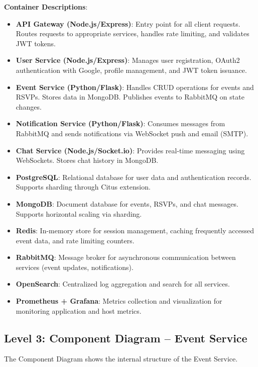 \documentclass[12pt,a4paper]{article}
\begin{document}
\textbf{Container Descriptions}:
\begin{itemize}
    \item \textbf{API Gateway (Node.js/Express)}: Entry point for all client requests. Routes requests to appropriate services, handles rate limiting, and validates JWT tokens.
    \item \textbf{User Service (Node.js/Express)}: Manages user registration, OAuth2 authentication with Google, profile management, and JWT token issuance.
    \item \textbf{Event Service (Python/Flask)}: Handles CRUD operations for events and RSVPs. Stores data in MongoDB. Publishes events to RabbitMQ on state changes.
    \item \textbf{Notification Service (Python/Flask)}: Consumes messages from RabbitMQ and sends notifications via WebSocket push and email (SMTP).
    \item \textbf{Chat Service (Node.js/Socket.io)}: Provides real-time messaging using WebSockets. Stores chat history in MongoDB.
    \item \textbf{PostgreSQL}: Relational database for user data and authentication records. Supports sharding through Citus extension.
    \item \textbf{MongoDB}: Document database for events, RSVPs, and chat messages. Supports horizontal scaling via sharding.
    \item \textbf{Redis}: In-memory store for session management, caching frequently accessed event data, and rate limiting counters.
    \item \textbf{RabbitMQ}: Message broker for asynchronous communication between services (event updates, notifications).
    \item \textbf{OpenSearch}: Centralized log aggregation and search for all services.
    \item \textbf{Prometheus + Grafana}: Metrics collection and visualization for monitoring application and host metrics.
\end{itemize}

\subsection{Level 3: Component Diagram -- Event Service}

The Component Diagram shows the internal structure of the Event Service.
\end{document}
